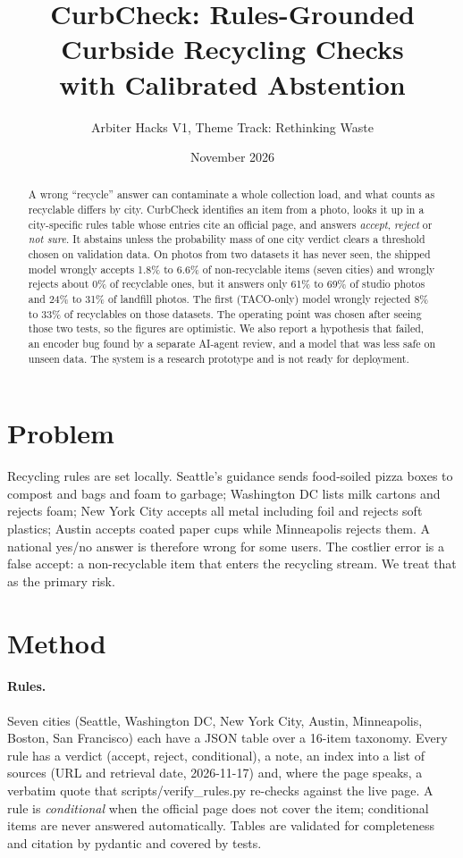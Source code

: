\documentclass[11pt,a4paper]{article}
\title{CurbCheck: Rules-Grounded Curbside Recycling Checks\\with Calibrated Abstention}
\author{Arbiter Hacks V1, Theme Track: Rethinking Waste}
\date{November 2026}
\begin{document}
\maketitle
\begin{abstract}
A wrong ``recycle'' answer can contaminate a whole collection load, and what counts as recyclable differs by city.
CurbCheck identifies an item from a photo, looks it up in a city-specific rules table whose entries cite an official page,
and answers \emph{accept}, \emph{reject} or \emph{not sure}. It abstains unless the probability mass of one city verdict
clears a threshold chosen on validation data. On photos from two datasets it has never seen, the shipped model wrongly accepts 1.8\% to 6.6\% of non-recyclable items (seven cities) and wrongly rejects about 0\% of recyclable ones, but it answers only 61\% to 69\% of studio photos and 24\% to 31\% of landfill photos. The first (TACO-only) model wrongly rejected 8\% to 33\% of recyclables on those datasets. The operating point was chosen after seeing those two tests, so the figures are optimistic. We also report a hypothesis that failed, an encoder bug found by a separate AI-agent review, and a model that was less safe on unseen data. The system is a research prototype and is not ready for deployment.
\end{abstract}

\section{Problem}
Recycling rules are set locally. Seattle's guidance sends food-soiled pizza boxes to compost and bags and foam to garbage;
Washington DC lists milk cartons and rejects foam; New York City accepts all metal including foil and rejects soft plastics; Austin accepts coated paper cups while Minneapolis rejects them.
A national yes/no answer is therefore wrong for some users. The costlier error is a false accept: a non-recyclable item
that enters the recycling stream. We treat that as the primary risk.

\section{Method}
\paragraph{Rules.} Seven cities (Seattle, Washington DC, New York City, Austin, Minneapolis, Boston, San Francisco) each have a JSON table over a 16-item taxonomy. Every rule has a verdict (accept, reject, conditional),
a note, an index into a list of sources (URL and retrieval date, 2026-11-17) and, where the page speaks, a verbatim quote that scripts/verify\_rules.py re-checks against the live page. A rule is \emph{conditional} when the
official page does not cover the item; conditional items are never answered automatically. Tables are validated for
completeness and citation by pydantic and covered by tests.
\end{document}
